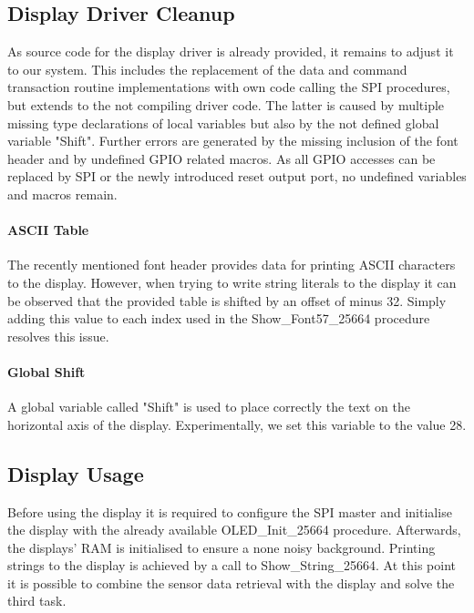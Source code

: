 		\subsection{Display Driver Cleanup} %
		\label{sub:impl_display_driver_cleanup}
			As source code for the display driver is already provided, it remains to adjust it to our system. This includes the replacement of the data and command transaction routine implementations with own code calling the SPI procedures, but extends to the not compiling driver code. The latter is caused by multiple missing type declarations of local variables but also by the not defined global variable "Shift". Further errors are generated by the missing inclusion of the font header and by undefined GPIO related macros. As all GPIO accesses can be replaced by SPI or the newly introduced reset output port, no undefined variables and macros remain.

			\paragraph{ASCII Table} %
			\label{par:ascii_table}
				The recently mentioned font header provides data for printing ASCII characters to the display. However, when trying to write string literals to the display it can be observed that the provided table is shifted by an offset of minus 32. Simply adding this value to each index used in the Show\_Font57\_25664 procedure resolves this issue.

			\paragraph{Global Shift} %
			\label{par:global_shift}
				A global variable called "Shift" is used to place correctly the text on the horizontal axis of the display. Experimentally, we set this variable to the value 28. 

		\subsection{Display Usage} %
		\label{sub:display_usage}
			Before using the display it is required to configure the SPI master and initialise the display with the already available OLED\_Init\_25664 procedure. Afterwards, the displays' RAM is initialised to ensure a none noisy background.
			Printing strings to the display is achieved by a call to Show\_String\_25664. At this point it is possible to combine the sensor data retrieval with the display and solve the third task.

